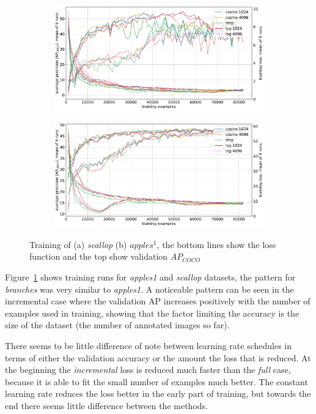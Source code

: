 \begin{figure}[h]
\centering
\begin{subfigure}[t]{0.5\linewidth}
  \includegraphics[width=1.0\linewidth]{charts/training/lr_schedule/scallops.pdf}
  \caption{}
\end{subfigure}%
\begin{subfigure}[t]{0.5\linewidth}
  \includegraphics[width=1.0\linewidth]{charts/training/lr_schedule/apples.pdf}
  \caption{}
\end{subfigure}
  \caption{Training of (a) \emph{scallop} (b) $apples^1$, the bottom lines show the loss function and the top show validation $AP_{COCO}$}  
  \label{fig:datasets_lr}
\end{figure}

Figure~\ref{fig:datasets_lr} shows training runs for \emph{apples1} and \emph{scallop} datasets, the pattern for \emph{branches} was very similar to \emph{apples1}. A noticeable pattern can be seen in the incremental case where the validation \gls{AP} increases positively with the number of examples used in training, showing that the factor limiting the accuracy is the size of the dataset (the number of annotated images so far).

There seems to be little difference of note between learning rate schedules in terms of either the validation accuracy or the amount the loss that is reduced. At the beginning the \emph{incremental} loss is reduced much faster than the \emph{full} case, because it is able to fit the small number of examples much better. The constant learning rate reduces the loss better in the early part of training, but towards the end there seems little difference between the methods. 

